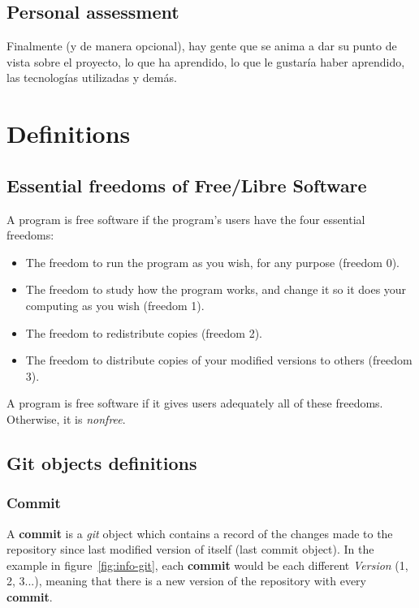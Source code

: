 \documentclass[a4paper, 12pt]{book}
\begin{document}
\section{Personal assessment}
\label{sec:assessment}
Finalmente (y de manera opcional), hay gente que se anima a dar su punto de
vista sobre el proyecto, lo que ha aprendido, lo que le gustaría haber aprendido,
las tecnologías utilizadas y demás.
\cleardoublepage
\appendix
\chapter{Definitions}
\label{app:definitions}
\section{Essential freedoms of Free/Libre Software}
\label{sec:freedoms}
A program is free software if the program's users have the four essential freedoms:
\begin{itemize}
   \item The freedom to run the program as you wish, for any purpose (freedom 0).
   \item The freedom to study how the program works, and change it so it does your computing as you wish (freedom 1).
   \item The freedom to redistribute copies (freedom 2).
   \item The freedom to distribute copies of your modified versions to others (freedom 3).
\end{itemize}
A program is free software if it gives users adequately all of these freedoms. Otherwise, it is \textit{nonfree}.
\section{Git objects definitions}
\label{sec:git-definitions}
\subsection{Commit}
\label{ssec:git-commit}
A \textbf{commit} is a \emph{git} object which contains a record of the changes made to the repository since last modified
version of itself (last commit object). In the example in figure~\ref{fig:info-git}, each \textbf{commit} would be each different
\textit{Version} (1, 2, 3...), meaning that there is a new version of the repository with every \textbf{commit}.
\end{document}

